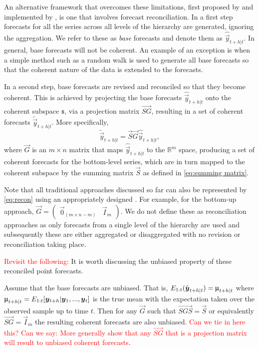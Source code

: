 \documentclass[graybox]{svmult}
\begin{document}
An alternative framework that overcomes these limitations, first proposed by \citet{HynEtAl2011} and implemented by \citet{AthEtAl2009}, is one that involves forecast reconciliation. In a first step forecasts for all the series across all levels of the hierarchy are generated, ignoring the aggregation. We refer to these as \textit{base} forecasts and denote them as $\hat{\vec{y}}_{t+h|t}$. In general, base forecasts will not be coherent. An example of an exception is when a simple method such as a random walk is used to generate all base forecasts so that the coherent nature of the data is extended to the forecasts.

In a second step, base forecasts are revised and reconciled so that they become coherent. This is achieved by projecting the base forecasts $\hat{\vec{y}}_{t+h|t}$ onto the coherent subspace $\mathfrak{s}$, via a projection matrix $\vec{SG}$, resulting in a set of coherent forecasts $\tilde{\vec{y}}_{t+h|t}$. More specifically,
\begin{equation}\label{eq:recon}
\tilde{\vec{y}}_{t+h|t}=\vec{S}\vec{G}\hat{\vec{y}}_{t+h|t},
\end{equation}
where $\vec{G}$ is an $m\times n$ matrix that maps $\hat{\vec{y}}_{t+h|t}$ to the $\mathbb{R}^m$ space, producing a set of coherent forecasts for the bottom-level series, which are in turn mapped to the coherent subspace by the summing matrix $\vec{S}$ as defined in \eqref{eq:summing matrix}.

Note that all traditional approaches discussed so far can also be represented by \eqref{eq:recon} using an appropriately designed . For example, for the bottom-up approach, $\vec{G}=\begin{pmatrix}
\vec{0}_{(m \times n-m)} & \vec{I}_m
\end{pmatrix}$. We do not define these as reconciliation approaches as only forecasts from a single level of the hierarchy are used and subsequently these are either aggregated or disaggregated with no revision or reconciliation taking place.

\textcolor{red}{Revisit the following:}
It is worth discussing the unbiased property of these reconciled point forecasts.

Assume that the base forecasts are unbiased. That is, $E_{1:t}(\hat{\vec{y}}_{t+h|t})=\umu_{t+h|t}$ where $\umu_{t+h|t} = E_{1:t}[\vec{y}_{t+h}|\vec{y}_1,...,\vec{y}_t]$ is the true mean with the expectation taken over the observed sample up to time $t$. Then for any $\vec{G}$ such that $\vec{SGS}=\vec{S}$ or equivalently $\vec{SG}=\vec{I}_m$ the resulting coherent forecasts are also unbiased. \textcolor{red}{Can we tie in here this? Can we say: More generally \citep{Gamakumara2018} show that any $\vec{SG}$ that is a projection matrix will result to unbiased coherent forecasts}.
\end{document}
